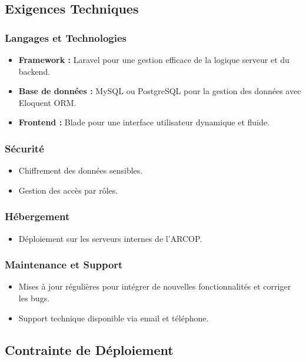 \subsection{Exigences Techniques}

\subsubsection{Langages et Technologies}
\begin{itemize}
    \item \textbf{Framework :} Laravel pour une gestion efficace de la logique serveur et du backend.
    \item \textbf{Base de données :} MySQL ou PostgreSQL pour la gestion des données avec Eloquent ORM.
    \item \textbf{Frontend :} Blade pour une interface utilisateur dynamique et fluide.

\end{itemize}


\subsubsection{Sécurité}
\begin{itemize}
    \item Chiffrement des données sensibles.
    \item Gestion des accès par rôles.
\end{itemize}

\subsubsection{Hébergement}
\begin{itemize}
    \item Déploiement sur les serveurs internes de l'ARCOP.
\end{itemize}

\subsubsection{Maintenance et Support}
\begin{itemize}
    \item Mises à jour régulières pour intégrer de nouvelles fonctionnalités et corriger les bugs.
    \item Support technique disponible via email et téléphone.
\end{itemize}

\subsection{Contrainte de Déploiement}

